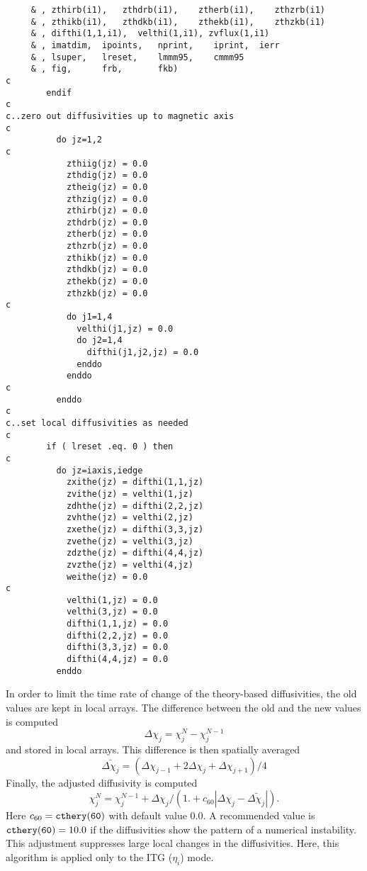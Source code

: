 \begin{verbatim}
     & , zthirb(i1),   zthdrb(i1),    ztherb(i1),    zthzrb(i1)
     & , zthikb(i1),   zthdkb(i1),    zthekb(i1),    zthzkb(i1)
     & , difthi(1,1,i1),  velthi(1,i1), zvflux(1,i1)
     & , imatdim,  ipoints,   nprint,    iprint,  ierr
     & , lsuper,   lreset,    lmmm95,    cmmm95 
     & , fig,      frb,       fkb)
c
        endif
c
c..zero out diffusivities up to magnetic axis
c
          do jz=1,2
c
            zthiig(jz) = 0.0
            zthdig(jz) = 0.0
            ztheig(jz) = 0.0
            zthzig(jz) = 0.0
            zthirb(jz) = 0.0
            zthdrb(jz) = 0.0
            ztherb(jz) = 0.0
            zthzrb(jz) = 0.0
            zthikb(jz) = 0.0
            zthdkb(jz) = 0.0
            zthekb(jz) = 0.0
            zthzkb(jz) = 0.0
c
            do j1=1,4
              velthi(j1,jz) = 0.0
              do j2=1,4
                difthi(j1,j2,jz) = 0.0
              enddo
            enddo
c
          enddo
c
c..set local diffusivities as needed
c
        if ( lreset .eq. 0 ) then
c
          do jz=iaxis,iedge
            zxithe(jz) = difthi(1,1,jz)
            zvithe(jz) = velthi(1,jz)
            zdhthe(jz) = difthi(2,2,jz)
            zvhthe(jz) = velthi(2,jz)
            zxethe(jz) = difthi(3,3,jz)
            zvethe(jz) = velthi(3,jz)
            zdzthe(jz) = difthi(4,4,jz)
            zvzthe(jz) = velthi(4,jz)
            weithe(jz) = 0.0
c
            velthi(1,jz) = 0.0
            velthi(3,jz) = 0.0
            difthi(1,1,jz) = 0.0
            difthi(2,2,jz) = 0.0
            difthi(3,3,jz) = 0.0
            difthi(4,4,jz) = 0.0
          enddo
\end{verbatim}

In order to limit the time rate of change of the theory-based 
diffusivities, the old values are kept in local arrays.
The difference between the old and the new values is computed
\[ \Delta \chi_j = \chi^{N}_j - \chi^{N-1}_j \]
and stored in local arrays.
This difference is then spatially averaged
\[  \bar{ \Delta \chi_j }
    = ( \Delta \chi_{j-1} + 2 \Delta \chi_j +  \Delta \chi_{j+1} ) / 4 \]
Finally, the adjusted diffusivity is computed
\[ \chi^N_j = \chi^{N-1}_j
 + \Delta \chi_j /
 ( 1. + c_{60} |  \Delta \chi_j - \bar{ \Delta \chi_j} | ). \]
Here $ c_{60} = {\tt cthery(60)} $ with default value 0.0.
A recommended value is $ {\tt cthery(60)} = 10.0 $
if the diffusivities show the pattern of a numerical instability.
This adjustment suppresses large local changes in the diffusivities.
Here, this algorithm is applied only to the ITG ($\eta_i$) mode.

